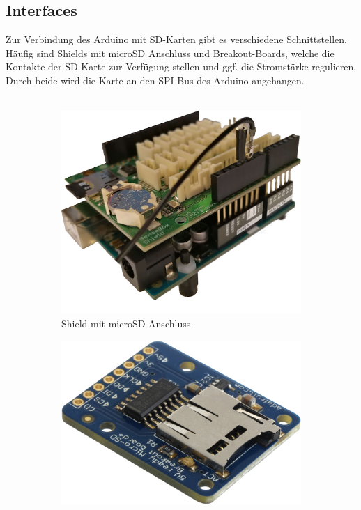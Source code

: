\documentclass[ngerman]{schoolPres}
\begin{document}
  \subsection{Interfaces}%
  \begin{frame}
    Zur Verbindung des Arduino mit SD-Karten gibt es verschiedene Schnittstellen.
    Häufig sind Shields mit microSD Anschluss und Breakout-Boards,
    welche die Kontakte der SD-Karte zur Verfügung stellen und ggf. die Stromstärke regulieren.
    Durch beide wird die Karte an den SPI-Bus des Arduino angehangen.\\~\\

    \begin{figure}[!ht]
      \centering
      \begin{subfigure}{.3\linewidth}
        \includegraphics[width=\linewidth]{media/shield.jpg}
        \caption{\tiny Shield mit microSD Anschluss}
      \end{subfigure}\hspace{4em}
      \begin{subfigure}{.3\linewidth}
        \includegraphics[width=\linewidth]{media/sd-breakout.jpg}

\end{subfigure}
\end{figure}
\end{frame}
\end{document}
